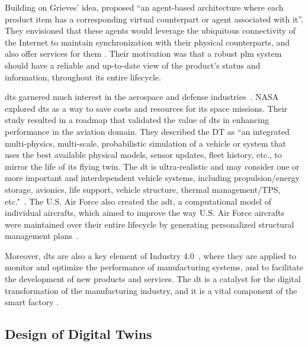 Building on Grieves' idea, \textcite{framlingProductAgentsHandling2003} proposed ``an agent-based architecture where each product item has a corresponding virtual counterpart or agent associated with it''. They envisioned that these agents would leverage the ubiquitous connectivity of the Internet to maintain synchronization with their physical counterparts, and also offer services for them \parencite{framlingProductAgentsHandling2003}. Their motivation was that a robust \acrshort{plm} system should have a reliable and up-to-date view of the product's status and information, throughout its entire lifecycle.

\acrshort{dt}s garnered much interest in the aerospace and defense industries~\parencite{negriReviewRolesDigital2017}. NASA explored \acrshort{dt}s as a way to save costs and resources for its space missions. Their study resulted in a roadmap that validated the value of \acrshort{dt}s in enhancing performance in the aviation domain. They described the DT as ``an integrated multi-physics, multi-scale, probabilistic simulation of a vehicle or system that uses the best available physical models, sensor updates, fleet history, etc., to mirror the life of its flying twin. The \acrshort{dt} is ultra-realistic and may consider one or more important and interdependent vehicle systems, including propulsion/energy storage, avionics, life support, vehicle structure, thermal management/TPS, etc.\''~\parencite{shaftoModelingSimulationInformation2010}. The U.S. Air Force also created the \acrfull{adt}, a computational model of individual aircrafts, which aimed to improve the way U.S. Air Force aircrafts were maintained over their entire lifecycle by generating personalized structural management plans~\parencite{tuegelAirframeDigitalTwin2012,gockelChallengesStructuralLife2012}.

Moreover, \acrshort{dt}s are also a key element of Industry 4.0~\parencite{brettelHowVirtualizationDecentralization2014,hermannDesignPrinciplesIndustrie2016,vachalekDigitalTwinIndustrial2017,negriReviewRolesDigital2017}, where they are applied to monitor and optimize the performance of manufacturing systems, and to facilitate the development of new products and services. The \acrshort{dt} is a catalyst for the digital transformation of the manufacturing industry, and it is a vital component of the smart factory \parencite{mabkhotRequirementsSmartFactory2018}.

\subsection{Design of Digital Twins}\label{sec:dt_design}

